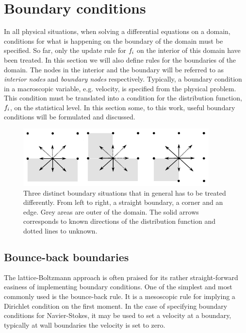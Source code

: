 \section{Boundary conditions}\label{sec:lbm:bound}
In all physical situations, when solving a differential equations on a
domain, conditions for what is happening on the boundary of the domain
must be specified. So far, only the update rule for $f_i$ on the
interior of this domain have been treated. In this section we will
also define rules for the boundaries of the domain. The nodes in the
interior and the boundary will be referred to as \emph{interior nodes}
and \emph{boundary nodes} respectively. Typically, a boundary
condition in a macroscopic variable, e.g. velocity, is specified from
the physical problem. This condition must be translated into a
condition for the distribution function, $f_i$, on the statistical
level. In this section some, to this work, useful boundary conditions
will be formulated and discussed.

\begin{figure}
\begin{center}
\includegraphics[width=0.9\textwidth]{fig/bb.pdf}
\end{center}
\caption{Three distinct boundary situations that in general has to be
  treated differently. From left to right, a straight boundary, a
  corner and an edge. Grey areas are outer of the domain. The solid
  arrows corresponds to known directions of the distribution function
  and dotted lines to unknown.}
\label{fig:lbm:bounds}
\end{figure}

\subsection{Bounce-back boundaries}\label{sec:lbm:bb}
The lattice-Boltzmann approach is often praised for its rather
straight-forward easiness of implementing boundary conditions. One of
the simplest and most commonly used is the bounce-back rule. It is a
mesoscopic rule for implying a Dirichlet condition on the first
moment. In the case of specifying boundary conditions for
Navier-Stokes, it may be used to set a velocity at a boundary,
typically at wall boundaries the velocity is set to zero.

